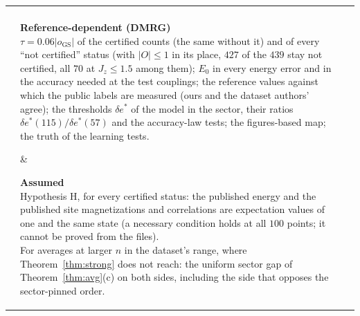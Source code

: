 \documentclass[aps,prx,twocolumn,10pt,superscriptaddress,nofootinbib,longbibliography,floatfix]{revtex4-2}
\theoremstyle{remark}
\newcommand{\Jz}{J_z}
\newcommand{\des}{\delta e^{*}}
\newcommand{\GS}{\mathrm{GS}}
\begin{document}
\begin{table}[t]
\begin{ruledtabular}
\begin{tabular}{lll}
{construction; energies and labels are evaluated in floating point by two codes and, off the grid of stored
couplings, the energies follow from a stored derivative (Methods).\\[2pt]} & %
\parbox[t]{0.23\textwidth}{\textbf{Reference-dependent (DMRG)}\\[2pt] %
$\tau=0.06|o_\GS|$ of the certified counts (the same without it) and of every ``not certified'' status (with %
$|O|\le1$ in its place, $427$ of the $439$ stay not certified, all $70$ at $\Jz\le1.5$ among them); $E_0$ in every %
energy error and in the
accuracy needed at the test couplings; the reference values against which the public labels are measured (ours and
the dataset authors' agree); the thresholds $\des$ of the model in the sector, their ratios $\des(115)/\des(57)$ and
the accuracy-law tests; the figures-based map; the truth of the learning tests.\\[2pt]} & %
\parbox[t]{0.19\textwidth}{\textbf{Assumed}\\[2pt] %
Hypothesis H, for every certified status: the published energy and the published site magnetizations and
correlations are expectation values of one and the same state (a necessary condition holds at all $100$ points; it %
cannot be proved from the files).\\
For averages at larger $n$ in the dataset's range, where Theorem~\ref{thm:strong} does not reach: the uniform sector
gap of Theorem~\ref{thm:avg}(c) on both sides, including the side that opposes the sector-pinned
order.\\[2pt]} %
\end{tabular}
\end{ruledtabular}
\end{table}
\end{document}
